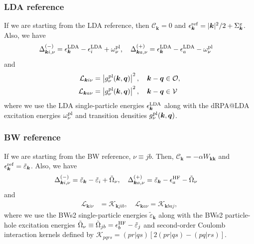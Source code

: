 \subsubsection{LDA reference}
 If we are starting from the LDA reference, then $\mathcal{C}_{\bm{k}}=0$ and $\epsilon_{\bm{k}}^{\rm ref}=|\bm{k}|^2/2 + \Sigma_{\bm{k}}^x$. Also, we have
\begin{align}
\Delta_{\bm{k}i,\nu}^{(-)}
&=
\epsilon_{\bm{k}}^{\rm LDA}
-\epsilon_i^{\rm LDA}
+
\omega_{\nu}^{\rm pl}, \quad
\Delta_{\bm{k}a,\nu}^{(+)}
=
\epsilon_{\bm{k}}^{\rm LDA}
-\epsilon_a^{\rm LDA}
-
\omega_{\nu}^{\rm pl}
\end{align}
and
\begin{align}
\mathcal{L}_{\bm{k}i\nu}
&=
\left|g_\nu^{\rm pl}(\bm{k},\bm{q})\right|^2, \quad \bm{k}-\bm{q}\in\mathcal{O},\\
\mathcal{L}_{\bm{k}a\nu}
&=
\left|g_\nu^{\rm pl}(\bm{k},\bm{q})\right|^2, \quad \bm{k}-\bm{q}\in\mathcal{V}
\end{align}
where we use the LDA single-particle energies $\epsilon_{\bm{k}}^{\rm LDA}$ along with the dRPA@LDA excitation energies $\omega_{\nu}^{\rm pl}$ and transition densities $g_\nu^{\rm pl}(\bm{k},\bm{q})$.
\subsubsection{BW reference}
 If we are starting from the BW reference, $\nu\equiv jb$. Then, $\mathcal{C}_{\bm{k}}=-\alpha W_{\bm{k}\bm{k}}$ and $\epsilon_{\bm{k}}^{\rm ref}=\tilde{\varepsilon}_{\bm{k}}$. Also,
we have
\begin{align}
\Delta_{\bm{k}i,\nu}^{(-)}
&=
\tilde{\varepsilon}_{\bm{k}}
-\tilde{\varepsilon}_i
+
\tilde{\Omega}_{\nu}, \quad
\Delta_{\bm{k}a,\nu}^{(+)}
=
\tilde{\varepsilon}_{\bm{k}}
-\epsilon_a^{\rm HF}
-
\tilde{\Omega}_{\nu}
\end{align}
and
\begin{align}
\mathcal{L}_{\bm{k}i\nu}
&=
\mathcal{K}_{\bm{k}jib}, \quad
\mathcal{L}_{\bm{k}a\nu}=
\mathcal{K}_{\bm{k}baj},
\end{align}
where we use the BWs2 single-particle energies $\tilde{\varepsilon}_{\bm{k}}$ along with the BWs2 particle-hole excitation energies $\tilde{\Omega}_{\nu}\equiv \tilde{\Omega}_{jb}=\epsilon_b^{\rm HF}-\tilde{\varepsilon}_j$ and second-order Coulomb interaction kernels defined by $\mathcal K_{pqrs}=
(pr|qs)
\left[
2(pr|qs)-(pq|rs)
\right]$.


